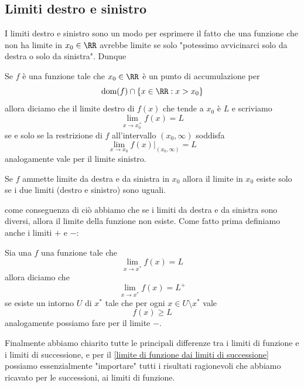 \documentclass[11pt]{scrartcl}
\begin{document}
	\subsection{Limiti destro e sinistro}
	I limiti destro e sinistro sono un modo per esprimere il fatto che una funzione che non ha limite in $x_0\in\RR$ avrebbe limite se solo "potessimo avvicinarci solo da destra o solo da sinistra". Dunque
	\begin{definition}
		Se $f$ è una funzione tale che $x_0\in\RR$ è un punto di accumulazione per 
		$$\text{dom}(f)\cap \left\{x\in\RR:x>x_0\right\}$$
		allora diciamo che il limite destro di $f(x)$ che tende a $x_0$ è $L$ e scriviamo
		$$\lim_{x\to x_0^+}f(x)=L$$
		se e solo se la restrizione di $f$ all'intervallo $(x_0,\infty)$ soddisfa
		$$\lim_{x\to x_0}f(x)\big|_{(x_0,\infty)}=L$$
		analogamente vale per il limite sinistro.
	\end{definition}
	\begin{proposition}
		Se $f$ ammette limite da destra e da sinistra in $x_0$ allora il limite in $x_0$ esiste solo se i due limiti (destro e sinistro) sono uguali.
	\end{proposition}
	come conseguenza di ciò abbiamo che se i limiti da destra e da sinistra sono diversi, allora il limite della funzione non esiste.
	Come fatto prima definiamo anche i limiti $+$ e $-$:
	\begin{definition}[Limiti $+$ e $-$]
		Sia una $f$ una funzione tale che 
		$$\lim_{x\to x^*}f(x)=L$$
		allora diciamo che 
		$$\lim_{x\to x^*}f(x)=L^+$$
		se esiste un intorno $U$ di $x^*$ tale che per ogni $x\in U\setminus x^*$ vale
		$$f(x)\ge L$$
		analogamente possiamo fare per il limite $-$.
	\end{definition}
	Finalmente abbiamo chiarito tutte le principali differenze tra i limiti di funzione e i limiti di successione, e per il \ref{limite di funzione dai limiti di successione} possiamo essenzialmente "importare" tutti i risultati ragionevoli che abbiamo ricavato per le successioni, ai limiti di funzione.
\end{document}
